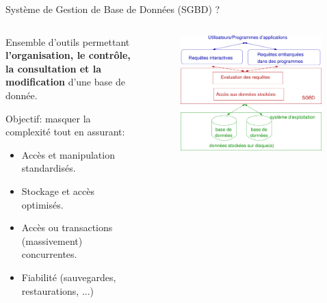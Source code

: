 \documentclass[xetex,dvipsnames]{beamer}
\begin{document}
\begin{frame}{Système de Gestion de Base de Données (SGBD) ?}
  \begin{columns}
	    \begin{column}{0.5\textwidth}
	     \begin{exampleblock}{}
	     	Ensemble d'outils permettant \textbf{l'organisation, le contrôle, la consultation et la modification} d'une base de donnée.
	     \end{exampleblock}
	     Objectif: masquer la complexité tout en assurant:
		 	\begin{itemize}
		 		\item Accès et manipulation standardisés.
		 		\item Stockage et accès optimisés.
		 		\item Accès ou transactions (massivement) concurrentes.
		 		\item Fiabilité (sauvegardes, restaurations, ...)
		 	\end{itemize}
		\end{column}
		\begin{column}{0.5\textwidth}
		\begin{figure} \begin{center}\includegraphics[width=0.99\textwidth]{./figures/SGBDR.png}\end{center}\end{figure}
		\end{column}
	\end{columns}
\end{frame}
\end{document}
